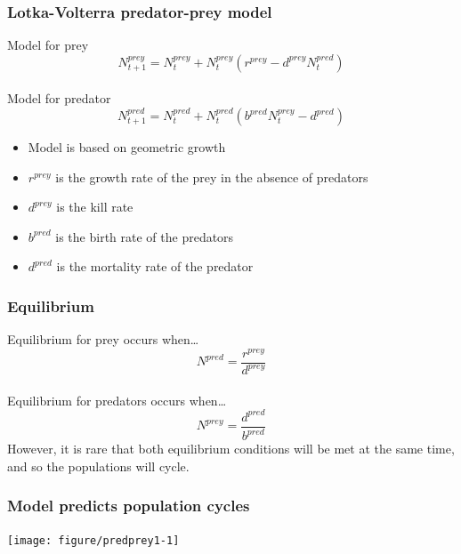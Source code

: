 \documentclass[color=usenames,dvipsnames]{beamer}\usepackage[]{graphicx}\usepackage[]{color}
\begin{document}
\begin{frame}
  \frametitle{Lotka-Volterra predator-prey model}
  \Large
  Model for prey
  \[
    N^{prey}_{t+1} = N^{prey}_t + N^{prey}_t (r^{prey} - d^{prey} N^{pred}_t)
  \] \\
  \vspace{1cm}
  \pause
  Model for predator
  \[
    N^{pred}_{t+1} = N^{pred}_t + N^{pred}_t (b^{pred}N^{prey}_t - d^{pred})
  \]
  \pause
  \vfill
  \normalsize
  \begin{itemize}
    \item Model is based on geometric growth
    \item $r^{prey}$ is the growth rate of the prey in the absence of
      predators
    \item $d^{prey}$ is the kill rate
    \item $b^{pred}$ is the birth rate of the predators
    \item $d^{pred}$ is the mortality rate of the predator
  \end{itemize}
\end{frame}



\begin{frame}
  \frametitle{Equilibrium}
  \Large
  Equilibrium for prey occurs when\dots
  \[
    N^{pred} = \frac{r^{prey}}{d^{prey}}
  \] \\
  \vspace{1cm}
  \pause
  Equilibrium for predators occurs when\dots
  \[
    N^{prey} = \frac{d^{pred}}{b^{pred}}
  \]
  \pause
  \vfill
  \large
  However, it is rare that both equilibrium conditions will be met at
  the same time, and so the populations will cycle.
\end{frame}



\begin{frame}[fragile]
  \frametitle{Model predicts population cycles}
\vspace{-1.2cm}

\begin{center}
  \texttt{[image: figure/predprey1-1]}
\end{center}
\end{frame}
\end{document}
